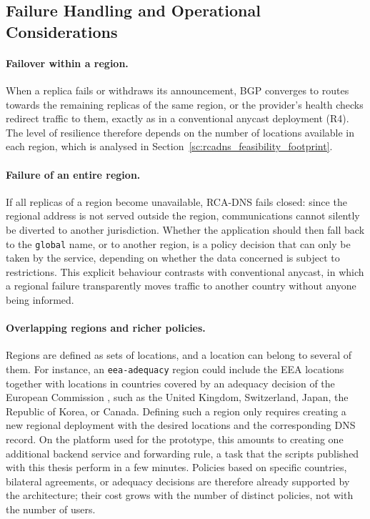 \subsection{Failure Handling and Operational Considerations}
\label{sc:rcadns_operations}

\paragraph{Failover within a region.} When a replica fails or withdraws its announcement, BGP converges to routes towards the remaining replicas of the same region, or the provider's health checks redirect traffic to them, exactly as in a conventional anycast deployment (R4). The level of resilience therefore depends on the number of locations available in each region, which is analysed in Section~\ref{sc:rcadns_feasibility_footprint}.

\paragraph{Failure of an entire region.} If all replicas of a region become unavailable, RCA-DNS fails closed: since the regional address is not served outside the region, communications cannot silently be diverted to another jurisdiction. Whether the application should then fall back to the \texttt{global} name, or to another region, is a policy decision that can only be taken by the service, depending on whether the data concerned is subject to restrictions. This explicit behaviour contrasts with conventional anycast, in which a regional failure transparently moves traffic to another country without anyone being informed.

\paragraph{Overlapping regions and richer policies.} Regions are defined as sets of locations, and a location can belong to several of them. For instance, an \texttt{eea-adequacy} region could include the EEA locations together with locations in countries covered by an adequacy decision of the European Commission \cite{DataCountries}, such as the United Kingdom, Switzerland, Japan, the Republic of Korea, or Canada. Defining such a region only requires creating a new regional deployment with the desired locations and the corresponding DNS record. On the platform used for the prototype, this amounts to creating one additional backend service and forwarding rule, a task that the scripts published with this thesis perform in a few minutes. Policies based on specific countries, bilateral agreements, or adequacy decisions are therefore already supported by the architecture; their cost grows with the number of distinct policies, not with the number of users.

